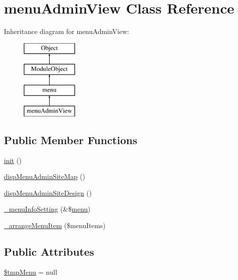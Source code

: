\hypertarget{classmenuAdminView}{}\section{menu\+Admin\+View Class Reference}
\label{classmenuAdminView}
Inheritance diagram for menu\+Admin\+View\+:\begin{figure}[H]
\begin{center}
\leavevmode
\includegraphics[height=4.000000cm]{classmenuAdminView}
\end{center}
\end{figure}
\subsection*{Public Member Functions}
\begin{DoxyCompactItemize}
\item 
\hyperlink{classmenuAdminView_ae7bc53b51dbc5c57f396420ec4180db0}{init} ()
\item 
\hyperlink{classmenuAdminView_afa55cc43041d721b52b8504c3b34e625}{disp\+Menu\+Admin\+Site\+Map} ()
\item 
\hyperlink{classmenuAdminView_a29d653c99c2e86ed5b8324042ef447ba}{disp\+Menu\+Admin\+Site\+Design} ()
\item 
\hyperlink{classmenuAdminView_abbcdc54eb95b1c114d43c347fd1f1008}{\+\_\+menu\+Info\+Setting} (\&\$\hyperlink{classmenu}{menu})
\item 
\hyperlink{classmenuAdminView_a9ae9e6a8ade5abcef97bd946d4ca99f7}{\+\_\+arrange\+Menu\+Item} (\$menu\+Items)
\end{DoxyCompactItemize}
\subsection*{Public Attributes}
\begin{DoxyCompactItemize}
\item 
\hyperlink{classmenuAdminView_a50d98e62711bbf3f6326b4aab2bcb12a}{\$tmp\+Menu} = null
\end{DoxyCompactItemize}



